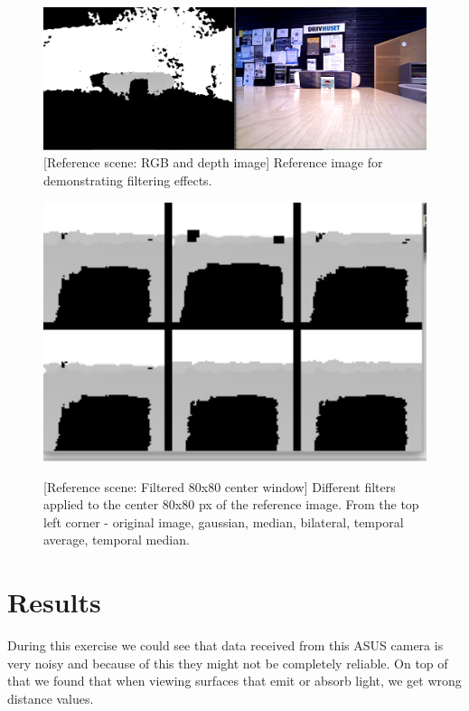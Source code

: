 \documentclass[11pt]{article}
\begin{document}
\begin{figure}[ht]
  \centering
  \includegraphics[width=1\textwidth]{figures/reference_rgb_depth.png}
  [Reference scene: RGB and depth image]{\label{fig:refimage}
    Reference image for demonstrating filtering effects.}
\end{figure}
\begin{figure}[ht]
  \centering
  \includegraphics[width=1\textwidth]{figures/applied_filters_center.png}
  
  [Reference scene: Filtered 80x80 center
  window]{\label{fig:filterswindow} Different filters applied
    to the center 80x80 px of the reference image. From the top left corner - original
    image, gaussian, median, bilateral, temporal average, temporal median.}
\end{figure}

\section{Results}
During this exercise we could see that data received from this ASUS camera is 
very noisy and because of this they might not be completely reliable. On top of 
that we found that when viewing surfaces that emit or absorb light, we 
get wrong distance values. \par
\end{document}
